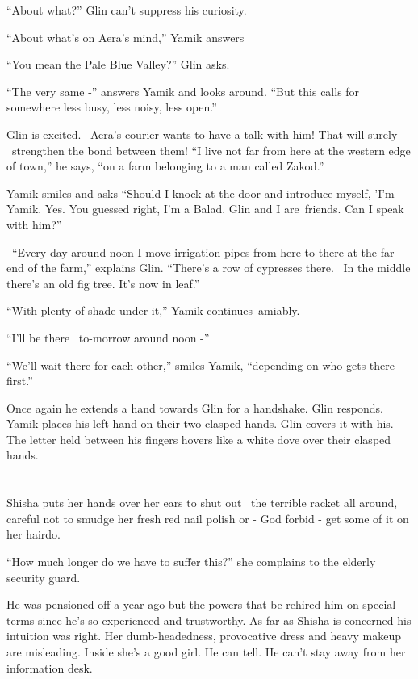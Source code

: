 \documentclass[twoside,11pt]{book}
\begin{document}
``About what?'' Glin can't suppress his curiosity.

``About what's on Aera's mind,'' Yamik answers

``You mean the Pale Blue Valley?'' Glin asks.

``The very same -'' answers Yamik and looks around. ``But this calls for
somewhere less busy, less noisy, less open.''

Glin is excited. \ Aera's courier wants to have a talk with him! That will surely \ strengthen the bond between them!
``I live not far from here at the western edge of town,'' he says, ``on a farm
belonging to a man called Zakod.''

Yamik smiles and asks ``Should I knock at the door and introduce myself, 'I'm Yamik. Yes. You guessed
right, I'm a Balad. Glin and I are~friends. Can I speak with him?''

\ ``Every day around noon I move irrigation pipes from here to there at the far end of the farm,'' explains
Glin. ``There's a row of cypresses there. ~In the middle there's an old fig tree. It's now in leaf.''

``With plenty of shade under it,'' Yamik continues~amiably.

``I'll be there \ to-morrow around noon -''

``We'll wait there for each other,'' smiles Yamik, ``depending on who gets there
first.'' ~

Once again he extends a hand towards Glin for a handshake. Glin responds. Yamik places his left hand on their two
clasped hands. Glin covers it with his. The letter held between his fingers hovers like a white dove over their clasped
hands.


\bigskip

\chapter{}

Shisha puts her hands over her ears to shut out \ the terrible racket all around, careful not to smudge her fresh red
nail polish or - God forbid - get some of it on her hairdo.

``How much longer do we have to suffer this?'' she complains to the elderly security guard.

He was pensioned off a year ago but the powers that be rehired him on special terms since he's so experienced and
trustworthy. As far as Shisha is concerned his intuition was right. Her dumb-headedness, provocative dress and heavy
makeup are misleading. Inside she's a good girl. He can tell. He can't stay away from her information desk.
\end{document}
